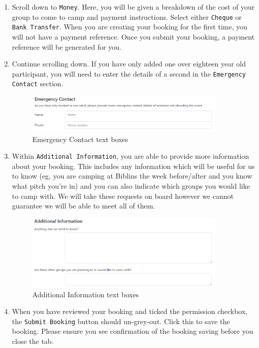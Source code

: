 \begin{enumerate}
\begin{figure}[H]
    \end{figure}
    \item Scroll down to \verb|Money|. Here, you will be given a breakdown of the cost of your group to come to camp and payment instructions. Select either \verb|Cheque| or \verb|Bank Transfer|. When you are creating your booking for the first time, you will not have a payment reference. Once you submit your booking, a payment reference will be generated for you. 
    \item Continue scrolling down. If you have only added one over eighteen year old participant, you will need to enter the details of a second in the \verb|Emergency Contact| section. 
    \begin{figure}[H]
        \centering
        \includegraphics[width=0.9\textwidth]{assets/book-emergencyContact.png}
        \caption{Emergency Contact text boxes}
    \end{figure}
    \item Within \verb|Additional Information|, you are able to provide more information about your booking. This includes any information which will be useful for us to know (eg, you are camping at Biblins the week before/after and you know what pitch you're in) and you can also indicate which groups you would like to camp with. We will take these requests on board however we cannot guarantee we will be able to meet all of them.
    \begin{figure}[H]
        \centering
        \includegraphics[width=0.9\textwidth]{assets/book-additionalInfo.png}
        \caption{Additional Information text boxes}
    \end{figure}
    \item When you have reviewed your booking and ticked the permission checkbox, the \verb|Submit Booking| button should un-grey-out. Click this to save the booking. Please ensure you see confirmation of the booking saving before you close the tab.\\

\end{enumerate}
